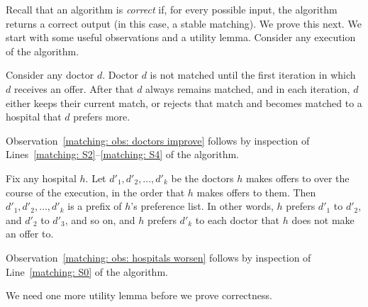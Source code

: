 \documentclass[11pt]{article}
\begin{document}
Recall that an algorithm is \emph{correct} if,
for every possible input, the algorithm returns a correct output (in this case, a stable matching).
We prove this next.
We start with some useful observations and a utility lemma.
Consider any execution of the algorithm. 

\begin{observation}[\KT p.\,7 (1.1)]\label{matching: obs: doctors improve}
  Consider any doctor $d$.
  Doctor $d$ is not matched until the first iteration in which $d$ receives an offer.
  After that $d$ always remains matched, and in each iteration, $d$ either keeps their current match,
  or rejects that match and becomes matched to a hospital that $d$ prefers more.
\end{observation}

Observation~\ref{matching: obs: doctors improve} follows by inspection of Lines~\ref{matching: S2}--\ref{matching: S4} of the algorithm.

\begin{observation}[\KT p.\,7 (1.2)]\label{matching: obs: hospitals worsen}
  Fix any hospital $h$.
  Let $d'_1, d'_2, \ldots, d'_k$ be the doctors $h$ makes offers to over the course of the execution,
  in the order that $h$ makes offers to them.
  Then $d'_1, d'_2, \ldots, d'_k$ is a prefix of $h$'s preference list.
  In other words, $h$ prefers $d'_1$ to $d'_2$, and $d'_2$ to $d'_3$, and so on,
  and $h$ prefers $d'_k$ to each doctor that $h$ does not make an offer to.
\end{observation}

Observation~\ref{matching: obs: hospitals worsen} follows by inspection of Line~\ref{matching: S0} of the algorithm.


We need one more utility lemma before we prove correctness.
\end{document}
